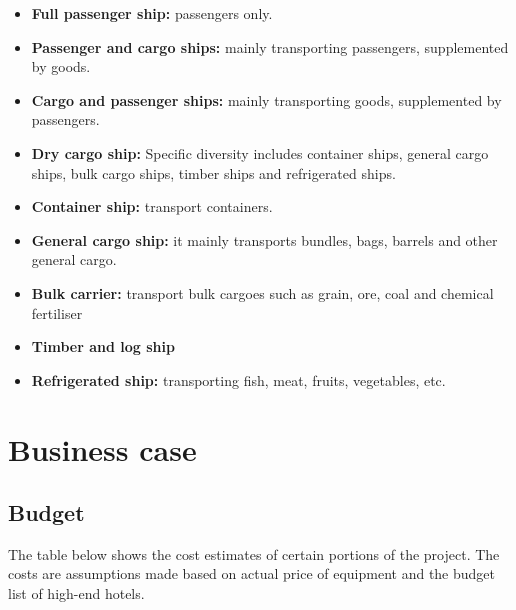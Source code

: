 \documentclass[11pt]{article}
\numberwithin{equation}{section}
\begin{document}
\begin{itemize}
\item \textbf{Full passenger ship:} passengers only.
\item \textbf{Passenger and cargo ships:} mainly transporting passengers, supplemented by goods.
\item \textbf{Cargo and passenger ships:} mainly transporting goods, supplemented by passengers.
\item \textbf{Dry cargo ship:} Specific diversity includes container ships, general cargo ships, bulk cargo ships, timber ships and refrigerated ships.
\item \textbf{Container ship:} transport containers.
\item \textbf{General cargo ship:} it mainly transports bundles, bags, barrels and other general cargo.
\item \textbf{Bulk carrier:} transport bulk cargoes such as grain, ore, coal and chemical fertiliser
\item \textbf{Timber and log ship}
\item \textbf{Refrigerated ship:} transporting fish, meat, fruits, vegetables, etc.
\end{itemize}

\section{Business case}
\label{sec:orgb4211a4}
\subsection{Budget}
\label{sec:org5b5d64e}
The table below shows the cost estimates of certain portions of the project. The costs are assumptions made based on actual price of equipment and the budget  list of high-end hotels.
\end{document}
